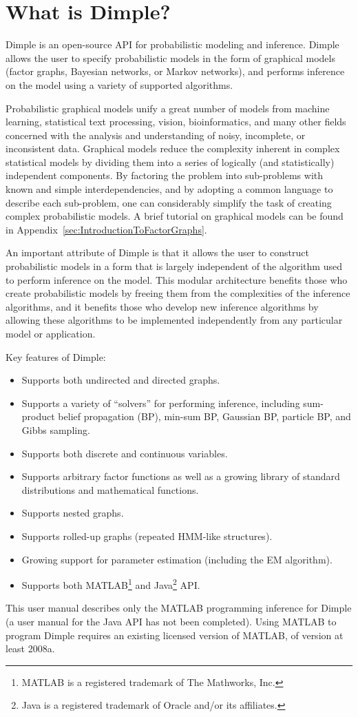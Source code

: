 \section{What is Dimple?}

Dimple is an open-source API for probabilistic modeling and inference. Dimple allows the user to specify probabilistic models in the form of graphical models (factor graphs, Bayesian networks, or Markov networks), and performs inference on the model using a variety of supported algorithms.

Probabilistic graphical models unify a great number of models from machine learning, statistical text processing, vision, bioinformatics, and many other fields concerned with the analysis and understanding of noisy, incomplete, or inconsistent data. Graphical models reduce the complexity inherent in complex statistical models by dividing them into a series of logically (and statistically) independent components. By factoring the problem into sub-problems with known and simple interdependencies, and by adopting a common language to describe each sub-problem, one can considerably simplify the task of creating complex probabilistic models.  A brief tutorial on graphical models can be found in Appendix~\ref{sec:IntroductionToFactorGraphs}.

An important attribute of Dimple is that it allows the user to construct probabilistic models in a form that is largely independent of the algorithm used to perform inference on the model. This modular architecture benefits those who create probabilistic models by freeing them from the complexities of the inference algorithms, and it benefits those who develop new inference algorithms by allowing these algorithms to be implemented independently from any particular model or application.

Key features of Dimple:
\begin{itemize}
\item Supports both undirected and directed graphs.
\item Supports a variety of ``solvers'' for performing inference, including sum-product belief propagation (BP), min-sum BP, Gaussian BP, particle BP, and Gibbs sampling.
\item Supports both discrete and continuous variables.
\item Supports arbitrary factor functions as well as a growing library of standard distributions and mathematical functions.
\item Supports nested graphs.
\item Supports rolled-up graphs (repeated HMM-like structures).
\item Growing support for parameter estimation (including the EM algorithm).
\item Supports both MATLAB\footnote{MATLAB is a registered trademark of The Mathworks, Inc.} and Java\footnote{Java is a registered trademark of Oracle and/or its affiliates.} API.
\end{itemize}

This user manual describes only the MATLAB programming inference for Dimple (a user manual for the Java API has not been completed).  Using MATLAB to program Dimple requires an existing licensed version of MATLAB, of version at least 2008a.